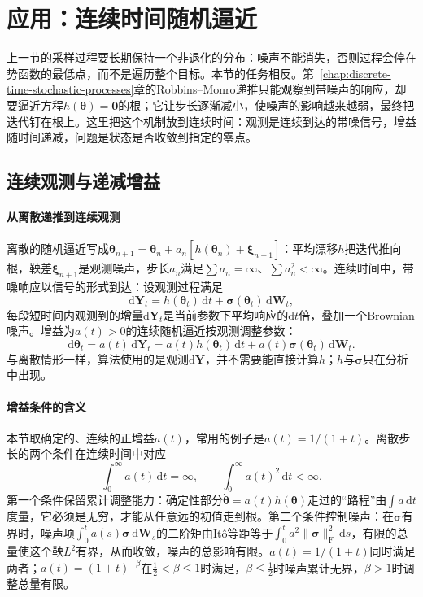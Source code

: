 \section{应用：连续时间随机逼近}
\label{sec:ctsp-stochastic-approximation}

上一节的采样过程要长期保持一个非退化的分布：噪声不能消失，否则过程会停在势函数的最低点，而不是遍历整个目标。本节的任务相反。第~\ref{chap:discrete-time-stochastic-processes}章的Robbins--Monro递推只能观察到带噪声的响应，却要逼近方程$h(\bm\theta)=\bm0$的根；它让步长逐渐减小，使噪声的影响越来越弱，最终把迭代钉在根上。这里把这个机制放到连续时间：观测是连续到达的带噪信号，增益随时间递减，问题是状态是否收敛到指定的零点。

\subsection{连续观测与递减增益}
\label{sec:ctsp-sa-setting}

\paragraph{从离散递推到连续观测}
离散的随机逼近写成$\bm\theta_{n+1}=\bm\theta_n+a_n[h(\bm\theta_n)+\bm\xi_{n+1}]$：平均漂移$h$把迭代推向根，鞅差$\bm\xi_{n+1}$是观测噪声，步长$a_n$满足$\sum a_n=\infty$、$\sum a_n^2<\infty$。连续时间中，带噪响应以信号的形式到达：设观测过程满足
\begin{equation}
  \mathrm d\bm Y_t=h(\bm\theta_t)\,\mathrm dt+\bm\sigma(\bm\theta_t)\,\mathrm d\bm W_t ,
  \label{eq:ctsp-sa-observation}
\end{equation}
每段短时间内观测到的增量$\mathrm d\bm Y_t$是当前参数下平均响应的$\mathrm dt$倍，叠加一个Brownian噪声。增益为$a(t)>0$的连续随机逼近按观测调整参数：
\begin{equation}
  \mathrm d\bm\theta_t=a(t)\,\mathrm d\bm Y_t=a(t)h(\bm\theta_t)\,\mathrm dt+a(t)\bm\sigma(\bm\theta_t)\,\mathrm d\bm W_t .
  \label{eq:ctsp-continuous-sa}
\end{equation}
与离散情形一样，算法使用的是观测$\mathrm d\bm Y$，并不需要能直接计算$h$；$h$与$\bm\sigma$只在分析中出现。

\paragraph{增益条件的含义}
本节取确定的、连续的正增益$a(t)$，常用的例子是$a(t)=1/(1+t)$。离散步长的两个条件在连续时间中对应
\begin{equation}
  \int_0^\infty a(t)\,\mathrm dt=\infty,\qquad\int_0^\infty a(t)^2\,\mathrm dt<\infty .
  \label{eq:ctsp-gain-conditions}
\end{equation}
第一个条件保留累计调整能力：确定性部分$\dot{\bm\theta}=a(t)h(\bm\theta)$走过的“路程”由$\int a\,\mathrm dt$度量，它必须是无穷，才能从任意远的初值走到根。第二个条件控制噪声：在$\bm\sigma$有界时，噪声项$\int_0^ta(s)\bm\sigma\,\mathrm d\bm W_s$的二阶矩由Itô等距等于$\int_0^ta^2\|\bm\sigma\|_{\mathrm F}^2\,\mathrm ds$，有限的总量使这个鞅$L^2$有界，从而收敛，噪声的总影响有限。$a(t)=1/(1+t)$同时满足两者；$a(t)=(1+t)^{-\beta}$在$\frac12<\beta\leq1$时满足，$\beta\leq\frac12$时噪声累计无界，$\beta>1$时调整总量有限。

